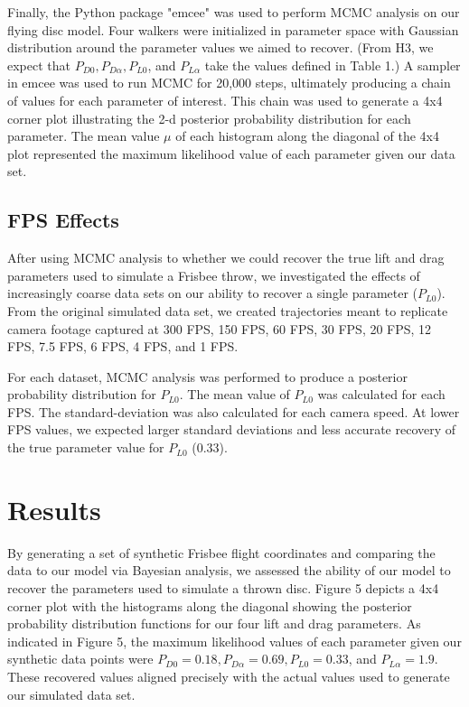 \documentclass[a4paper,12pt, oneside]{article}
\begin{document}
Finally, the Python package "emcee" was used to perform MCMC analysis on our flying disc model. Four walkers were initialized in parameter space with Gaussian distribution around the parameter values we aimed to recover. (From H3, we expect that $P_{D0}, P_{D\alpha}, P_{L0}$, and $P_{L\alpha}$ take the values defined in Table 1.) A sampler in emcee was used to run MCMC for 20,000 steps, ultimately producing a chain of values for each parameter of interest.  This chain was used to generate a 4x4 corner plot illustrating the 2-d posterior probability distribution for each parameter. The mean value $\mu$ of each histogram along the diagonal of the 4x4 plot represented the maximum likelihood value of each parameter given our data set.

\subsection{FPS Effects}
After using MCMC analysis to whether we could recover the true lift and drag parameters used to simulate a Frisbee throw, we investigated the effects of increasingly coarse data sets on our ability to recover a single parameter ($P_{L0}$). From the original simulated data set, we created trajectories meant to replicate camera footage captured at 300 FPS, 150 FPS, 60 FPS, 30 FPS, 20 FPS, 12 FPS, 7.5 FPS, 6 FPS, 4 FPS, and 1 FPS.

For each dataset, MCMC analysis was performed to produce a posterior probability distribution for $P_{L0}$. The mean value of $P_{L0}$ was calculated for each FPS. The standard-deviation was also calculated for each camera speed. At lower FPS values, we expected larger standard deviations and less accurate recovery of the true parameter value for $P_{L0}$ (0.33).

\section{Results}

By generating a set of synthetic Frisbee flight coordinates and comparing the data to our model via Bayesian analysis, we assessed the ability of our model to recover the parameters used to simulate a thrown disc. Figure 5 depicts a 4x4 corner plot with the histograms along the diagonal showing the posterior probability distribution functions for our four lift and drag parameters. As indicated in Figure 5, the maximum likelihood values of each parameter given our synthetic data points were $P_{D0} = 0.18, P_{D\alpha}=0.69, P_{L0}=0.33$, and $P_{L\alpha}=1.9$. These recovered values aligned precisely with the actual values used to generate our simulated data set.
\end{document}
